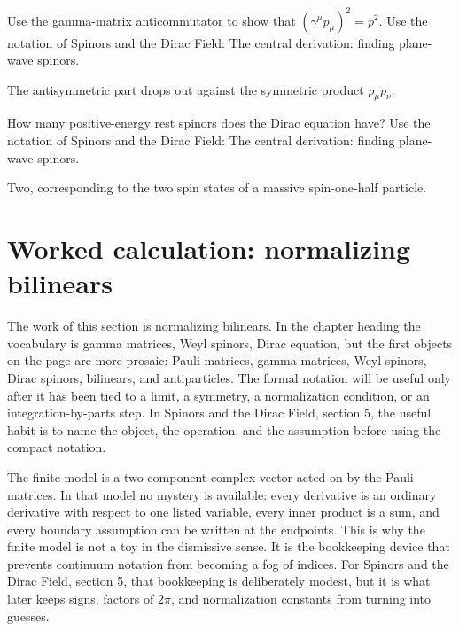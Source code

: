 \begin{exercise}
Use the gamma-matrix anticommutator to show that \((\gamma^\mu p_\mu)^2=p^2\).  Use the notation of Spinors and the Dirac Field: The central derivation: finding plane-wave spinors.
\begin{answer}
The antisymmetric part drops out against the symmetric product \(p_\mu p_\nu\).
\end{answer}
\end{exercise}

\begin{exercise}
How many positive-energy rest spinors does the Dirac equation have?  Use the notation of Spinors and the Dirac Field: The central derivation: finding plane-wave spinors.
\begin{answer}
Two, corresponding to the two spin states of a massive spin-one-half particle.
\end{answer}
\end{exercise}



\section{Worked calculation: normalizing bilinears}













The work of this section is normalizing bilinears.  In the chapter heading the vocabulary is gamma matrices, Weyl spinors, Dirac equation, but the first objects on the page are more prosaic: Pauli matrices, gamma matrices, Weyl spinors, Dirac spinors, bilinears, and antiparticles.  The formal notation will be useful only after it has been tied to a limit, a symmetry, a normalization condition, or an integration-by-parts step.  In Spinors and the Dirac Field, section 5, the useful habit is to name the object, the operation, and the assumption before using the compact notation.

The finite model is a two-component complex vector acted on by the Pauli matrices.  In that model no mystery is available: every derivative is an ordinary derivative with respect to one listed variable, every inner product is a sum, and every boundary assumption can be written at the endpoints.  This is why the finite model is not a toy in the dismissive sense.  It is the bookkeeping device that prevents continuum notation from becoming a fog of indices.  For Spinors and the Dirac Field, section 5, that bookkeeping is deliberately modest, but it is what later keeps signs, factors of \(2\pi\), and normalization constants from turning into guesses.

